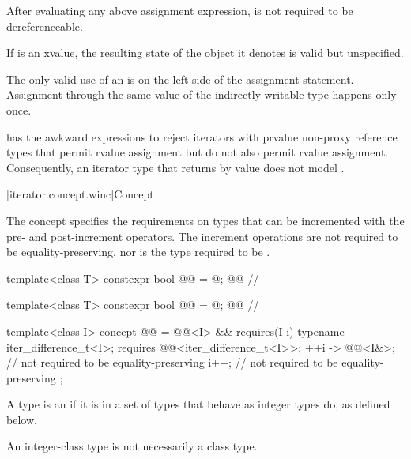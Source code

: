 \pnum
After evaluating any above assignment expression,  is not required to be dereferenceable.

\pnum
If  is an xvalue, the resulting
state of the object it denotes is valid but unspecified.

\pnum
\begin{note}
The only valid use of an  is on the left side of the assignment statement.
Assignment through the same value of the indirectly writable type happens only once.
\end{note}

\pnum
\begin{note}
 has the awkward  expressions to reject
iterators with prvalue non-proxy reference types that permit rvalue
assignment but do not also permit  rvalue assignment.
Consequently, an iterator type  that returns 
by value does not model .
\end{note}

[iterator.concept.winc]{Concept }

\pnum
The  concept specifies the requirements on
types that can be incremented with the pre- and post-increment operators.
The increment operations are not required to be equality-preserving,
nor is the type required to be .

\begin{codeblock}
template<class T>
  constexpr bool @@ = @\seebelow@; @\itcorr[-2]@          // \expos

template<class T>
  constexpr bool @@ = @\seebelow@; @\itcorr[-2]@   // \expos

template<class I>
  concept @@ =
    @@<I> &&
    requires(I i) {
      typename iter_difference_t<I>;
      requires @@<iter_difference_t<I>>;
      { ++i } -> @@<I&>;                           // not required to be equality-preserving
      i++;                                              // not required to be equality-preserving
    };
\end{codeblock}

\pnum
A type  is an 
if it is in a set of  types
that behave as integer types do, as defined below.
\begin{note}
An integer-class type is not necessarily a class type.
\end{note}

